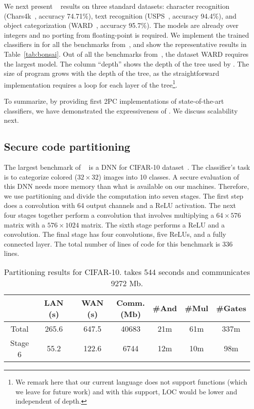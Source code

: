 We next present \bonsai~\cite{bonsai} results on three
standard datasets: character recognition (Chars4k~\cite{campos},
accuracy 74.71\%), text recognition (USPS~\cite{hull}, accuracy
94.4\%), and object categorization (WARD~\cite{yang}, accuracy
95.7\%). 
The \bonsai models are already over integers and no porting from
floating-point is required.
We implement the trained classifiers in \tool for all the benchmarks
from~\cite{bonsai},
and show the representative results in Table~\ref{tab:bonsai}.
Out of all the benchmarks from~\cite{bonsai}, the dataset WARD
requires the largest model. 
The column ``depth''  shows the depth of the
tree used by \bonsai. The size of \tool 
program grows with the depth of the tree, as the straightforward \tool
implementation requires a loop for each layer of the
tree\footnote{We remark here that our current language does not support functions (which we leave for future work) and with this support, LOC would be lower and independent of depth.}. 

To summarize, by providing first 2PC implementations of
state-of-the-art classifiers, we have demonstrated the expressiveness
of \tool. We discuss scalability next.


\subsection{Secure code partitioning}
\label{sec:pipeeval}
The largest benchmark of \minion~\cite{minionn} is a DNN for CIFAR-10
dataset~\cite{cifar}. 
The classifier's task is to categorize colored ($32\times 32$) images
into 10 classes. A secure evaluation of this DNN needs more memory
than what is available
on our machines. Therefore, we use partitioning and divide the
computation into seven stages. 
The first step does a convolution with 64 output channels and a ReLU
activation. The next four stages together perform a convolution that
involves multiplying a $64\times 576$ matrix with a 
$576\times 1024$ matrix. The sixth stage performs a ReLU and a
convolution. The final stage has four convolutions, five ReLUs, and a
fully connected layer. The total number of lines of \tool code for
this benchmark is 336 lines.

\setlength\tabcolsep{6pt}
\begin{table}
\begin{tabular}{|c|c|c|c |c|c|c|}
\hline
           &  LAN (s) & WAN (s) & \thead{Comm. \\ (Mb)}  & \#And & \#Mul & \#Gates \\
\hline
Total      &  265.6       & 647.5        & 40683       & 21m    & 61m    &  337m  \\
\hline
Stage 6    &  55.2        & 122.6        & 6744        & 12m    & 10m   &  98m  \\
\hline
\end{tabular}

 \caption{Partitioning results for CIFAR-10. \minion takes 544 seconds and communicates 9272 Mb.}
 \label{tab:cifar} 
\end{table}

